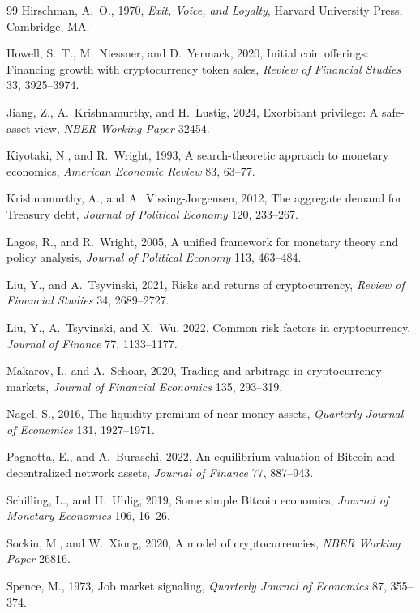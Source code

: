 \documentclass[12pt]{article}
\begin{document}
\begin{thebibliography}{99}
Hirschman, A.~O., 1970, \textit{Exit, Voice, and Loyalty},
Harvard University Press, Cambridge, MA.

Howell, S.~T., M.~Niessner, and D.~Yermack, 2020, Initial coin offerings: Financing
growth with cryptocurrency token sales, \textit{Review of Financial Studies} 33,
3925--3974.

Jiang, Z., A.~Krishnamurthy, and H.~Lustig, 2024, Exorbitant privilege: A safe-asset
view, \textit{NBER Working Paper} 32454.

Kiyotaki, N., and R.~Wright, 1993, A search-theoretic approach to monetary economics,
\textit{American Economic Review} 83, 63--77.

Krishnamurthy, A., and A.~Vissing-Jorgensen, 2012, The aggregate demand for Treasury
debt, \textit{Journal of Political Economy} 120, 233--267.

Lagos, R., and R.~Wright, 2005, A unified framework for monetary theory and policy
analysis, \textit{Journal of Political Economy} 113, 463--484.

Liu, Y., and A.~Tsyvinski, 2021, Risks and returns of cryptocurrency,
\textit{Review of Financial Studies} 34, 2689--2727.

Liu, Y., A.~Tsyvinski, and X.~Wu, 2022, Common risk factors in cryptocurrency,
\textit{Journal of Finance} 77, 1133--1177.

Makarov, I., and A.~Schoar, 2020, Trading and arbitrage in cryptocurrency markets,
\textit{Journal of Financial Economics} 135, 293--319.

Nagel, S., 2016, The liquidity premium of near-money assets,
\textit{Quarterly Journal of Economics} 131, 1927--1971.

Pagnotta, E., and A.~Buraschi, 2022, An equilibrium valuation of Bitcoin and
decentralized network assets, \textit{Journal of Finance} 77, 887--943.

Schilling, L., and H.~Uhlig, 2019, Some simple Bitcoin economics,
\textit{Journal of Monetary Economics} 106, 16--26.

Sockin, M., and W.~Xiong, 2020, A model of cryptocurrencies,
\textit{NBER Working Paper} 26816.

Spence, M., 1973, Job market signaling,
\textit{Quarterly Journal of Economics} 87, 355--374.

\end{thebibliography}
\end{document}
